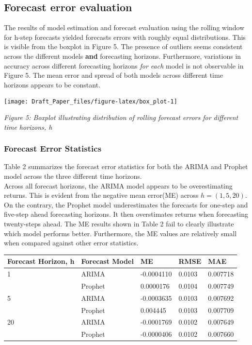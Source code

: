 \documentclass[12pt,a4paper]{article}
\numberwithin{equation}{section}
\numberwithin{figure}{section}
\numberwithin{table}{section}
\let\origfigure\figure
\let\endorigfigure\endfigure
\renewenvironment{figure}[1][2] {
    \expandafter\origfigure\expandafter[H]
} {
    \endorigfigure
}
\let\origtable\table
\let\endorigtable\endtable
\renewenvironment{table}[1][2] {
    \expandafter\origtable\expandafter[H]
} {
    \endorigtable
}
\begin{document}
\subsection{Forecast error evaluation}\label{forecast-error-evaluation}

The results of model estimation and forecast evaluation using the
rolling window for h-step forecasts yielded forecasts errors with
roughly equal distributions. This is visible from the boxplot in Figure
5. The presence of outliers seems consistent across the different models
\textbf{and} forecasting horizons. Furthermore, variations in accuracy
across different forecasting horizons \emph{for each} model is not
observable in Figure 5. The mean error and spread of both models across
different time horizons appears to be constant.

\begin{figure}

\begin{center}\texttt{[image: Draft\_Paper\_files/figure-latex/box\_plot-1]} \end{center}
\end{figure}

\emph{Figure 5: Boxplot illustrating distribution of rolling forecast
errors for different time horizons, h}

\subsubsection{Forecast Error
Statistics}\label{forecast-error-statistics}

Table 2 summarizes the forecast error statistics for both the ARIMA and
Prophet model across the three different time horizons.\\
Across all forecast horizons, the ARIMA model appears to be
overestimating returns. This is evident from the negative mean error(ME)
across \(h = (1,5,20)\). On the contrary, the Prophet model
underestimates the forecasts for one-step and five-step ahead
forecasting horizons. It then overstimates returns when forecasting
twenty-steps ahead. The ME results shown in Table 2 fail to clearly
illustrate which model performs better. Furthermore, the ME values are
relatively small when compared against other error statistics.

\begin{table}[H]
\centering
\caption{Forecast error diagnostic statistics over different forecasting horizons} 
\begin{tabular}{lllll}
  \hline
Forecast Horizon, h & Forecast Model &  ME  & RMSE & MAE \\ 
  \hline
1 & ARIMA & -0.0004110 & 0.0103 & 0.007718 \\ 
    & Prophet & 0.0000176 & 0.0104 & 0.007749 \\ 
  5 & ARIMA & -0.0003635 & 0.0103 & 0.007692 \\ 
    & Prophet & 0.004445 & 0.0103 & 0.007709 \\ 
  20 & ARIMA & -0.0001769 & 0.0102 & 0.007649 \\ 
    & Prophet & -0.0000406 & 0.0102 & 0.007660 \\ 
   \hline
\end{tabular}
\end{table}
\end{document}
